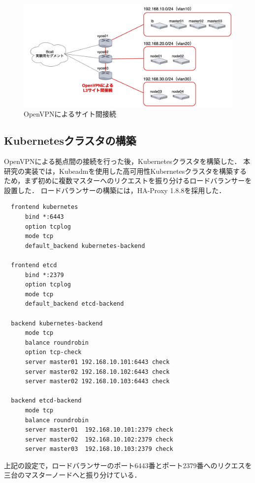 \begin{figure}[htbp]
  \begin{center}
    \includegraphics[width=\textwidth]{./figures/implement-environment-openvpn.png}
    \caption{OpenVPNによるサイト間接続}
  \end{center}
\end{figure}

\subsection{Kubernetesクラスタの構築}

OpenVPNによる拠点間の接続を行った後，Kubernetesクラスタを構築した．
本研究の実装では，Kubeadmを使用した高可用性Kubernetesクラスタを構築するため，まず初めに複数マスターへのリクエストを振り分けるロードバランサーを設置した．
ロードバランサーの構築には，HA-Proxy 1.8.8を採用した．\\

\begin{lstlisting}
  frontend kubernetes
      bind *:6443
      option tcplog
      mode tcp
      default_backend kubernetes-backend

  frontend etcd
      bind *:2379
      option tcplog
      mode tcp
      default_backend etcd-backend

  backend kubernetes-backend
      mode tcp
      balance roundrobin
      option tcp-check
      server master01 192.168.10.101:6443 check
      server master02 192.168.10.102:6443 check
      server master02 192.168.10.103:6443 check

  backend etcd-backend
      mode tcp
      balance roundrobin
      server master01  192.168.10.101:2379 check
      server master02  192.168.10.102:2379 check
      server master03  192.168.10.103:2379 check
\end{lstlisting}

上記の設定で，ロードバランサーのポート6443番とポート2379番へのリクエスを三台のマスターノードへと振り分けている．

